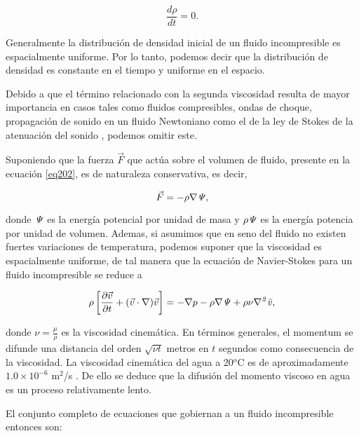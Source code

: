\begin{equation}\label{eq203}
   \frac{d \rho}{d t} = 0.
\end{equation}

Generalmente la distribución de densidad inicial de un fluido incompresible es espacialmente uniforme. Por lo tanto, podemos decir que la distribución de densidad es constante en el tiempo y uniforme en el espacio.

Debido a que el término relacionado con la segunda viscosidad resulta de mayor importancia en casos tales como fluidos compresibles, ondas de choque, propagación de sonido en un fluido Newtoniano como el de la ley de Stokes de la atenuación del sonido \cite{Anderson, Dukhin, Litovitz}, podemos omitir este.

Suponiendo que la fuerza $\vec{F}$ que actúa sobre el volumen de fluido, presente en la ecuación \ref{eq202}, es de naturaleza conservativa, es decir,

\begin{equation}\label{eq204}
   \vec{F} = -\rho \nabla \it\Psi,
\end{equation}


\noindent donde $\it\Psi$ es la energía potencial por unidad de masa y $\rho \it\Psi$ es la energía potencia por unidad de volumen. Ademas, si asumimos que en seno del fluido no existen fuertes variaciones de temperatura, podemos suponer que la viscosidad es espacialmente uniforme, de tal manera que la ecuación de Navier-Stokes para un fluido incompresible se reduce a

\begin{equation}\label{eq205}
   \rho \left[\frac{\partial \vec{v}}{\partial t} + (\vec{v} \cdot \nabla ) \vec{v}\right] = - \nabla p  - \rho \nabla \it\Psi + \rho \nu \nabla^2 \vec{v},
\end{equation}

\noindent donde $\nu=\tfrac{\mu}{\rho}$ es la viscosidad cinemática. En términos generales, el momentum se difunde una distancia del orden $\sqrt{\nu t}$ metros en $t$ segundos como consecuencia de la viscosidad. La viscosidad cinemática del agua a 20$^o$C es de aproximadamente $1.0 \times 10^{-6}$ m$^2$/s \cite{Batchelor2002}. De ello se deduce que la difusión del momento viscoso en agua es un proceso relativamente lento.

El conjunto completo de ecuaciones que gobiernan a un fluido incompresible entonces son:

